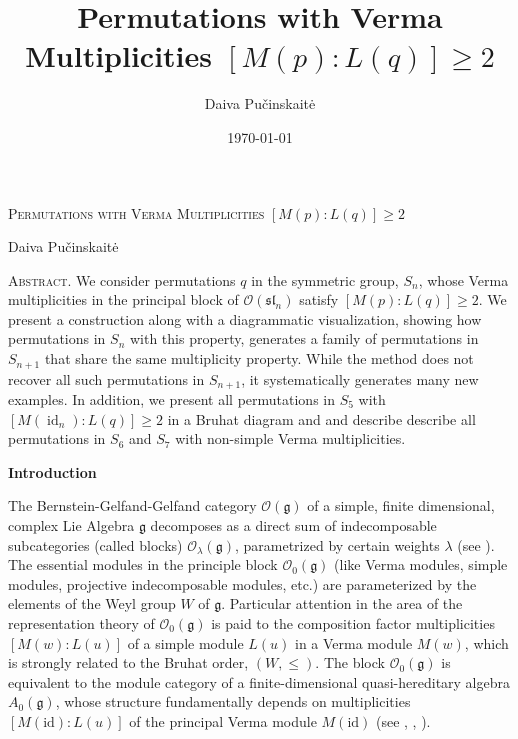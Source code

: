 \documentclass[a4 paper,12pt]{article}
\title{Permutations  with Verma Multiplicities $[M(p):L(q)] \geq 2$}
\author{Daiva Pu\v{c}inskait\.{e}}
\date{\today}
\newcommand{\ger}[1]{\mathfrak{#1}}
\newcommand{\OO}{\mathcal{O}}
\newcommand{\ma}{\leqslant}
\DeclareMathOperator{\id}{id}
\begin{document}
\begin{center}
\textsc{Permutations  with Verma Multiplicities} $[M(p):L(q)] \geq 2$
\end{center}
\begin{center}
Daiva Pu\v{c}inskait\.{e}
\end{center}

\begin{small}
\begin{center}
\begin{minipage}{13.4cm}
\textsc{Abstract.}  We consider permutations $q$ in the symmetric group, $S_n$,  whose Verma multiplicities in the principal block of $\mathcal{O}(\mathfrak{sl}_n)$ satisfy  $[M(p):L(q)] \geq 2$. We present a construction along with a diagrammatic visualization,  showing how  permutations in $S_{n}$ with this property, generates a family of permutations in $S_{n+1}$ that share the same multiplicity property.  While the method does not recover all such permutations in $S_{n+1}$, it systematically generates many new examples. In addition, we present all permutations in $S_{5}$ with $[M(\id_n):L(q)] \geq 2$ in a Bruhat diagram and and describe describe all  permutations in  $S_6$ and $S_7$ with non-simple Verma multiplicities.
\end{minipage}
\end{center}\end{small}



 
\begin{center}
\textbf{Introduction}
\end{center}




The Bernstein-Gelfand-Gelfand category  $\OO(\ger{g})$ of a simple, finite dimensional, complex Lie Algebra $\ger{g}$ decomposes as a  direct sum of indecomposable subcategories (called blocks)
$\OO_{\lambda}(\ger{g})$, parametrized by   certain weights $\lambda$ (see \cite{BGG}). The  essential modules in the principle block  $\OO_{0}(\ger{g})$    (like  Verma modules, simple modules, projective indecomposable modules, etc.) are  parameterized  by the elements of  the Weyl group $W$ of $\mathfrak{g}$.  
Particular attention in the 
area of the representation theory of $\OO_{0}(\ger{g})$ is paid to the  composition factor multiplicities $[M(w):L(u)]$  of a simple module $L(u)$ in  a  Verma 
 module $M(w)$, which  is strongly related to the Bruhat order, $(W, \ma)$.  The block $\OO_{0}(\mathfrak{g})$ is equivalent to the module category of a finite-dimensional quasi-hereditary algebra $A_{0}(\mathfrak{g})$, whose structure fundamentally depends on multiplicities $[M(\mathrm{id}):L(u)]$ of the principal Verma module $M(\mathrm{id})$ (see \cite{Sorgel}, \cite{CPS}, \cite{Str}). 
\end{document}
